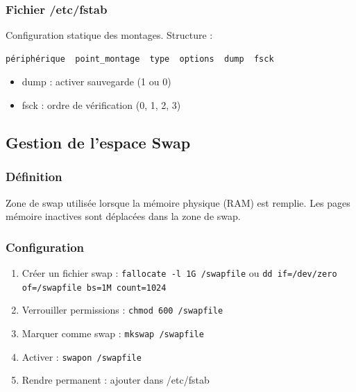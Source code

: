 \documentclass[12pt,a4paper]{article}
\begin{document}

\subsubsection{Fichier /etc/fstab}
Configuration statique des montages. Structure :
\begin{verbatim}
périphérique  point_montage  type  options  dump  fsck
\end{verbatim}
\begin{itemize}
    \item dump : activer sauvegarde (1 ou 0) %
    \item fsck : ordre de v\'erification (0, 1, 2, 3) %
\end{itemize}

\subsection{Gestion de l'espace Swap}


\subsubsection{D\'efinition}
Zone de swap utilis\'ee lorsque la m\'emoire physique (RAM) est remplie. Les pages m\'emoire inactives sont d\'eplac\'ees dans la zone de swap.

\subsubsection{Configuration}
\begin{enumerate}
    \item Cr\'eer un fichier swap : \texttt{fallocate -l 1G /swapfile} ou \texttt{dd if=/dev/zero of=/swapfile bs=1M count=1024}
    \item Verrouiller permissions : \texttt{chmod 600 /swapfile}
    \item Marquer comme swap : \texttt{mkswap /swapfile}
    \item Activer : \texttt{swapon /swapfile}
    \item Rendre permanent : ajouter dans /etc/fstab
\end{enumerate}
\end{document}
